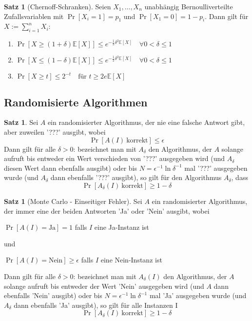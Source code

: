 \documentclass[a4paper, 10pt]{article}
\theoremstyle{definition}
\newtheorem{theorem}[definition]{Satz}
\theoremstyle{named}
\begin{document}
\setcounter{definition}{69}
\begin{theorem}[Chernoff-Schranken]
    Seien $X_1, \ldots, X_n$ unabhängig Bernoulliverteilte Zufallsvariablen mit $\Pr[X_i = 1] = p_1$ und $\Pr[X_1 = 0] = 1 - p_i$. Dann gilt für $X := \sum_{i = 1}^n X_i$:
    \begin{enumerate}[label=(\roman*)]
        \item $\Pr[X \geq (1+\delta)\mathbb{E}[X]] \leq e^{-\frac{1}{3}\delta^2\mathbb{E}[X]} \quad \forall 0 < \delta \leq 1$
        \item $\Pr[X \leq (1-\delta)\mathbb{E}[X]] \leq e^{-\frac{1}{2}\delta^2\mathbb{E}[X]} \quad \forall 0 < \delta \leq 1$
        \item $\Pr[X \geq t] \leq 2^{-t} \quad \text{für } t \geq 2e\mathbb{E}[X]$
    \end{enumerate}
\end{theorem}

\subsection{Randomisierte Algorithmen}
\setcounter{definition}{71}
\begin{theorem}
    Sei $A$ ein randomisierter Algorithmus, der nie eine falsche Antwort gibt, aber zuweilen '???' ausgibt, wobei $$\Pr[A(I) \ \text{korrekt}] \leq \epsilon$$
    Dann gilt für alle $\delta > 0$: bezeichnet man mit $A_\delta$ den Algorithmus, der $A$ solange aufruft bis entweder ein Wert verschieden von '???' ausgegeben wird (und $A_\delta$ diesen Wert dann ebenfalls ausgibt) oder bis $N = \epsilon^{-1}\ln \delta^{-1}$ mal '???' ausgegeben wurde (und $A_\delta$ dann ebenfalls '???' ausgibt), so gilt für den Algorithmus $A_\delta$, dass 
    $$\Pr[A_\delta(I) \ \text{korrekt}] \geq 1 - \delta$$
\end{theorem}

\setcounter{definition}{73}
\begin{theorem} [Monte Carlo - Einseitiger Fehler]
    Sei $A$ ein randomisierter Algorithmus, der immer eine der beiden Antworten 'Ja' oder 'Nein' ausgibt, wobei
    \begin{center}
        $\Pr[A(I) = \text{Ja}] = 1$ falls $I$ eine Ja-Instanz ist
    \end{center}
    und 
    \begin{center}
        $\Pr[A(I) = \text{Nein}] \geq \epsilon$ falls $I$ eine Nein-Instanz ist
    \end{center}
    Dann gilt für alle $\delta > 0$: bezeichnet man mit $A_\delta(I)$ den Algorithmus, der $A$ solange aufruft bis entweder der Wert 'Nein' ausgegeben wird (und $A$ dann ebenfalls 'Nein' ausgibt) oder bis $N = \epsilon^{-1} \ln \delta^{-1}$ mal 'Ja' ausgegeben wurde (und $A_\delta$ dann ebenfalls 'Ja' ausgibt), so gilt für alle Instanzen I
    $$\Pr[A_\delta(I) \ \text{korrekt}] \geq 1 - \delta$$
\end{theorem}
\end{document}
